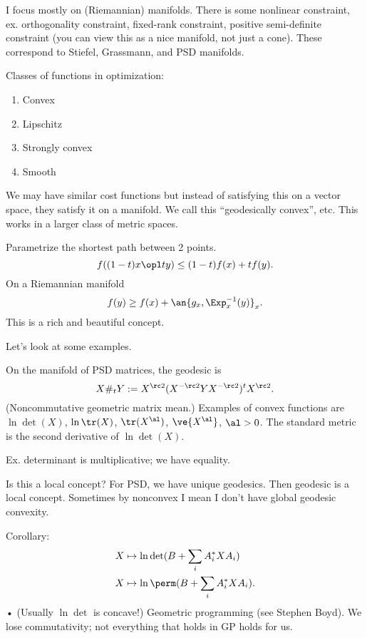 I focus mostly on (Riemannian) manifolds. There is some nonlinear constraint, ex. orthogonality constraint, fixed-rank constraint, positive semi-definite constraint (you can view this as a nice manifold, not just a cone). These correspond to Stiefel, Grassmann, and PSD manifolds.

Classes of functions in optimization:
\begin{enumerate}
\item
Convex
\item
Lipschitz
\item
Strongly convex
\item
Smooth
\end{enumerate}

We may have similar cost functions but instead of satisfying this on a vector space, they satisfy it on a manifold. We call this ``geodesically convex'', etc. This works in a larger class of metric spaces.

Parametrize the shortest path between 2 points. %
$$
f((1-t)x\opl ty ) \le (1-t)f(x) + tf(y).
$$
On a Riemannian manifold
$$
f(y) \ge f(x) + \an{g_x, \Exp_x^{-1}(y)}_x.
$$
This is a rich and beautiful concept.

Let's look at some examples.

On the manifold of PSD matrices, the geodesic is
$$
X\#_t Y := X^{\rc 2}(X^{-\rc 2} Y X^{-\rc 2})^tX^{\rc 2}.
$$
(Noncommutative geometric matrix mean.)
Examples of convex functions are $\ln \det (X)$, $\ln \tr(X)$, $\tr(X^\al)$, $\ve{X^\al}$, $\al>0$.
The standard metric is the second derivative of $\ln \det(X)$.

Ex. determinant is multiplicative; we have equality.

Is this a local concept? For PSD, we have unique geodesics. Then geodesic is a local concept. Sometimes by nonconvex I mean I don't have global geodesic convexity.


Corollary:
\begin{align}
X&\mapsto \ln \det (B + \sum_i A_i^*XA_i)\\
X&\mapsto \ln \perm(B+\sum_i A_i^*XA_i).
\end{align}•
(Usually $\ln \det$ is concave!) Geometric programming (see Stephen Boyd). We lose commutativity; not everything that holds in GP holds for us.

